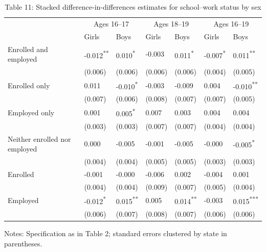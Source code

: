 \documentclass[12pt]{article}
\begin{document}
\begin{table}
\centering
\caption{Table 11: Stacked difference-in-differences estimates for school--work status by sex}

\small
\begin{tabular}{p{}p{}p{}p{}p{}p{}p{}}
\toprule
 & \multicolumn{2}{c}{Ages 16--17} & \multicolumn{2}{c}{Ages 18--19} & \multicolumn{2}{c}{Ages 16--19} \\

 & Girls & Boys & Girls & Boys & Girls & Boys \\
\midrule
Enrolled and employed & -0.012\textsuperscript{**} & 0.010\textsuperscript{*} & -0.003 & 0.011\textsuperscript{*} & -0.007\textsuperscript{*} & 0.011\textsuperscript{**} \\
 & (0.006) & (0.006) & (0.006) & (0.006) & (0.004) & (0.005) \\
Enrolled only & 0.011 & -0.010\textsuperscript{*} & -0.003 & -0.009 & 0.004 & -0.010\textsuperscript{**} \\
 & (0.007) & (0.006) & (0.008) & (0.007) & (0.007) & (0.005) \\
Employed only & 0.001 & 0.005\textsuperscript{*} & 0.007 & 0.003 & 0.004 & 0.004 \\
 & (0.003) & (0.003) & (0.007) & (0.007) & (0.004) & (0.004) \\
Neither enrolled nor employed & 0.000 & -0.005 & -0.001 & -0.005 & -0.000 & -0.005\textsuperscript{*} \\
 & (0.004) & (0.004) & (0.005) & (0.005) & (0.003) & (0.003) \\
Enrolled & -0.001 & -0.000 & -0.006 & 0.002 & -0.004 & 0.001 \\
 & (0.004) & (0.004) & (0.009) & (0.007) & (0.005) & (0.004) \\
Employed & -0.012\textsuperscript{*} & 0.015\textsuperscript{**} & 0.005 & 0.014\textsuperscript{**} & -0.003 & 0.015\textsuperscript{***} \\
 & (0.006) & (0.007) & (0.008) & (0.007) & (0.006) & (0.006) \\
\bottomrule
\end{tabular}



\noindent\small Notes: Specification as in Table 2; standard errors clustered by state in parentheses.

\end{table}
\end{document}

